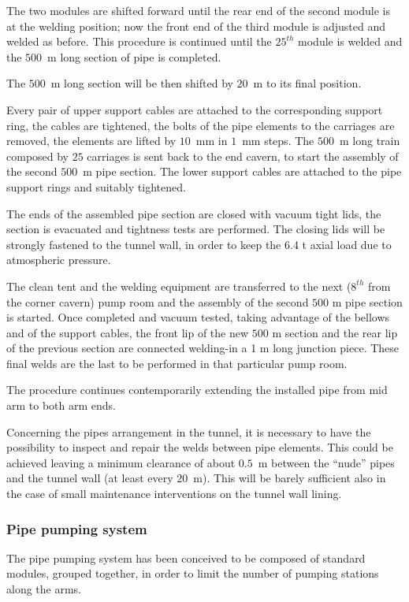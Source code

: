 The two modules are shifted forward until the rear end of the second module is at the welding position; now the front end of the third module is adjusted and welded as before. This procedure is continued until the $25^{th}$ module is welded and the $500$~m long section of pipe is completed. 

The $500$~m long section will be then shifted by $20$~m to its final position. 

Every pair of upper support cables are attached to the corresponding support ring, the cables are tightened, the bolts of the pipe elements to the carriages are removed, the elements are lifted by $10$~mm in $1$~mm steps. The $500$~m long train composed by $25$ carriages is sent back to the end cavern, to start the assembly of the second $500$~m pipe section. The lower support cables are attached to the pipe support rings and suitably tightened. 

The ends of the assembled pipe section are closed with vacuum tight lids, the section is evacuated and tightness tests are performed. The closing lids will be strongly fastened to the tunnel wall, in order to keep the 6.4 t axial load due to atmospheric pressure. 

The clean tent and the welding equipment are transferred to the next ($8^{th}$ from the corner cavern) pump room and the assembly of the second $500$ m pipe section is started. Once completed and vacuum tested, taking advantage of the bellows and of the support cables, the front lip of the new $500$ m section and the rear lip of the previous section are connected welding-in a 1 m long junction piece. These final welds are the last to be performed in that particular pump room. 

The procedure continues contemporarily extending the installed pipe from mid arm to both arm ends. 

Concerning the pipes arrangement in the tunnel, it is necessary to have the possibility to inspect and repair the welds between pipe elements. This could be achieved leaving a minimum clearance of about $0.5$~m between the ``nude'' pipes and the tunnel wall (at least every $20$~m). This will be barely sufficient also in the case of small maintenance interventions on the tunnel wall lining. 

\subsubsection{Pipe pumping system} 
The pipe pumping system has been conceived to be composed of standard modules, grouped together, in order to limit the number of pumping stations along the arms. 

